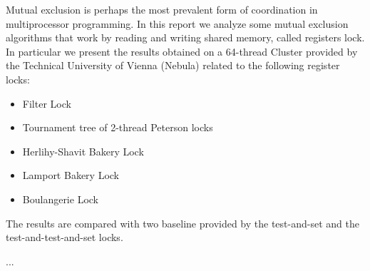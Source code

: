 Mutual exclusion is perhaps the most prevalent form of coordination in multiprocessor programming. In this report we analyze some mutual exclusion algorithms that work by reading and writing shared memory, called registers lock. In particular we present the results obtained on a 64-thread Cluster provided by the Technical University of Vienna (Nebula) related to the following register locks:

\begin{itemize}
	\item Filter Lock
	\item Tournament tree of 2-thread Peterson locks
	\item Herlihy-Shavit Bakery Lock
	\item Lamport Bakery Lock
	\item Boulangerie Lock
\end{itemize}

The results are compared with two baseline provided by the test-and-set and the test-and-test-and-set locks.


...